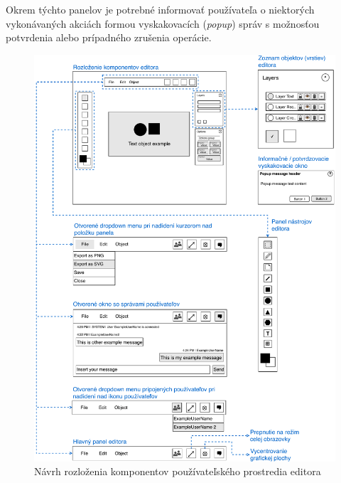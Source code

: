 Okrem týchto panelov je potrebné informovať používateľa o niektorých vykonávaných akciách formou vyskakovacích (\textit{popup}) správ s možnosťou potvrdenia alebo prípadného zrušenia operácie. 

\begin{figure}[h]
	\centerline{\includegraphics[width=1\textwidth]{images/diagrams/editor_wireframe_base}}
	\caption[Rozloženie komponentov editora]{Návrh rozloženia komponentov používateľského prostredia editora}
	\label{obr:editorWireframeBase}
\end{figure}
\FloatBarrier


